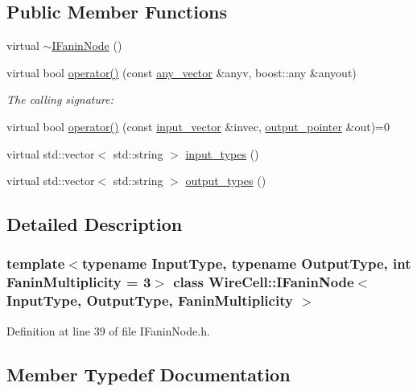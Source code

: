 \subsection*{Public Member Functions}
\begin{DoxyCompactItemize}
\item 
virtual \hyperlink{class_wire_cell_1_1_i_fanin_node_a95c4f9e85f09e8c0e438bf92cc189940}{$\sim$\+I\+Fanin\+Node} ()
\item 
virtual bool \hyperlink{class_wire_cell_1_1_i_fanin_node_a36fa55f6c92585211789beab2e2ef46a}{operator()} (const \hyperlink{class_wire_cell_1_1_i_fanin_node_base_a9dc315fe5b56f41f13ea247fc4b7f34b}{any\+\_\+vector} \&anyv, boost\+::any \&anyout)
\begin{DoxyCompactList}\small\item\em The calling signature\+: \end{DoxyCompactList}\item 
virtual bool \hyperlink{class_wire_cell_1_1_i_fanin_node_a48e76217dae73d64cb0b40cf8291564a}{operator()} (const \hyperlink{class_wire_cell_1_1_i_fanin_node_aec26233b8b7756c5a42280a5db47ffda}{input\+\_\+vector} \&invec, \hyperlink{class_wire_cell_1_1_i_fanin_node_a748d9cd1916dda1cb12c3376b229f906}{output\+\_\+pointer} \&out)=0
\item 
virtual std\+::vector$<$ std\+::string $>$ \hyperlink{class_wire_cell_1_1_i_fanin_node_a102c43a647e2e0070e329c397e27c2f5}{input\+\_\+types} ()
\item 
virtual std\+::vector$<$ std\+::string $>$ \hyperlink{class_wire_cell_1_1_i_fanin_node_a4d30445b258b6534fdc7825b63687642}{output\+\_\+types} ()
\end{DoxyCompactItemize}


\subsection{Detailed Description}
\subsubsection*{template$<$typename Input\+Type, typename Output\+Type, int Fanin\+Multiplicity = 3$>$\newline
class Wire\+Cell\+::\+I\+Fanin\+Node$<$ Input\+Type, Output\+Type, Fanin\+Multiplicity $>$}



Definition at line 39 of file I\+Fanin\+Node.\+h.



\subsection{Member Typedef Documentation}
\mbox{\label{class_wire_cell_1_1_i_fanin_node_ae4f0134fe2d798f865d358b24ab0ba9c}} 
